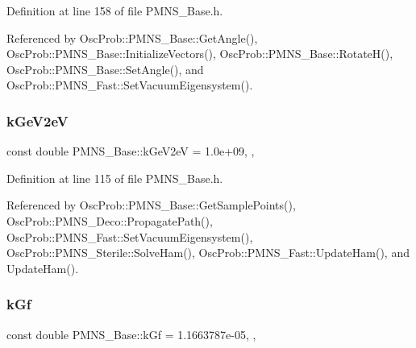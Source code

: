 Definition at line 158 of file P\+M\+N\+S\+\_\+\+Base.\+h.



Referenced by Osc\+Prob\+::\+P\+M\+N\+S\+\_\+\+Base\+::\+Get\+Angle(), Osc\+Prob\+::\+P\+M\+N\+S\+\_\+\+Base\+::\+Initialize\+Vectors(), Osc\+Prob\+::\+P\+M\+N\+S\+\_\+\+Base\+::\+Rotate\+H(), Osc\+Prob\+::\+P\+M\+N\+S\+\_\+\+Base\+::\+Set\+Angle(), and Osc\+Prob\+::\+P\+M\+N\+S\+\_\+\+Fast\+::\+Set\+Vacuum\+Eigensystem().

\mbox{\label{classOscProb_1_1PMNS__Base_ad36a0a6bf58d6ec093d3947784bd89e9}} 
\subsubsection{\texorpdfstring{k\+Ge\+V2eV}{kGeV2eV}}
{\footnotesize\ttfamily const double P\+M\+N\+S\+\_\+\+Base\+::k\+Ge\+V2eV = 1.\+0e+09\hspace{0.3cm}{\ttfamily [static]}, {\ttfamily [protected]}, {\ttfamily [inherited]}}



Definition at line 115 of file P\+M\+N\+S\+\_\+\+Base.\+h.



Referenced by Osc\+Prob\+::\+P\+M\+N\+S\+\_\+\+Base\+::\+Get\+Sample\+Points(), Osc\+Prob\+::\+P\+M\+N\+S\+\_\+\+Deco\+::\+Propagate\+Path(), Osc\+Prob\+::\+P\+M\+N\+S\+\_\+\+Fast\+::\+Set\+Vacuum\+Eigensystem(), Osc\+Prob\+::\+P\+M\+N\+S\+\_\+\+Sterile\+::\+Solve\+Ham(), Osc\+Prob\+::\+P\+M\+N\+S\+\_\+\+Fast\+::\+Update\+Ham(), and Update\+Ham().

\mbox{\label{classOscProb_1_1PMNS__Base_a7f26a3456128234b2ae6cc9141a6532f}} 
\subsubsection{\texorpdfstring{k\+Gf}{kGf}}
{\footnotesize\ttfamily const double P\+M\+N\+S\+\_\+\+Base\+::k\+Gf = 1.\+1663787e-\/05\hspace{0.3cm}{\ttfamily [static]}, {\ttfamily [protected]}, {\ttfamily [inherited]}}



